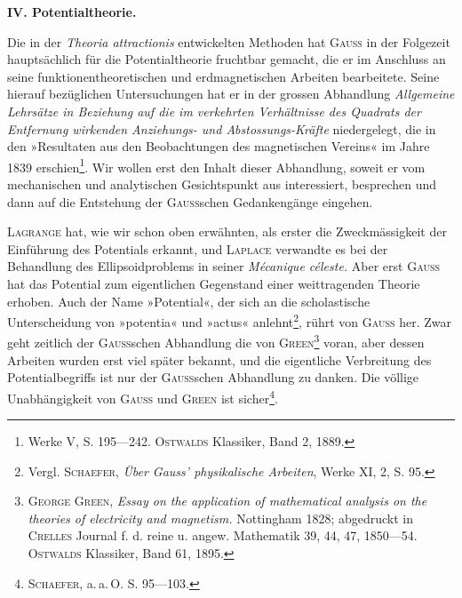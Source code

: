 \clearpage\begingroup{}
\makeatletter\tagsleft@true\let\veqno\@@leqno\makeatother
\renewcommand{\thefootnote}{\arabic{footnote})}\setcounter{footnote}{71}
\begin{center}\textbf{IV. Potentialtheorie.}\par\medskip
{}\end{center}
\noindent\hspace*{\parindent}Die in der \textit{Theoria attractionis} entwickelten Methoden hat \textsc{Gauss} in der
Folgezeit hauptsächlich für die Potentialtheorie fruchtbar gemacht, die er im
Anschluss an seine funktionentheoretischen und erdmagnetischen Arbeiten bearbeitete.
Seine hierauf bezüglichen Untersuchungen hat er in der grossen Abhandlung
\textit{Allgemeine Lehrsätze in Beziehung auf die im verkehrten Verhältnisse des Quadrats
der Entfernung wirkenden Anziehungs- und Abstossungs-Kräfte} niedergelegt,
die in den »Resultaten aus den Beobachtungen des magnetischen Vereins« im
Jahre 1839 erschien\footnote{Werke V, S. 195—242. \textsc{Ostwalds} Klassiker, Band 2, 1889.}. Wir wollen erst den Inhalt dieser Abhandlung, soweit
er vom mechanischen und analytischen Gesichtspunkt aus interessiert,
besprechen und dann auf die Entstehung der \textsc{Gauss}schen Gedankengänge eingehen.

\textsc{Lagrange} hat, wie wir schon oben erwähnten, als erster die Zweckmässigkeit
der Einführung des Potentials erkannt, und \textsc{Laplace} verwandte es bei
der Behandlung des Ellipsoidproblems in seiner \textit{Mécanique céleste.} Aber erst
\textsc{Gauss} hat das Potential zum eigentlichen Gegenstand einer weittragenden
Theorie erhoben. Auch der Name »Potential«, der sich an die scholastische
Unterscheidung von »potentia« und »actus« anlehnt\footnote{Vergl. \textsc{Schaefer}, \textit{Über Gauss’ physikalische Arbeiten}, Werke XI, 2, S. 95.}, rührt von \textsc{Gauss} her.
Zwar geht zeitlich der \textsc{Gauss}schen Abhandlung die von \textsc{Green}\footnote{\textsc{George Green}, \textit{Essay on the application of mathematical analysis on the theories of electricity
and magnetism.} Nottingham 1828; abgedruckt in \textsc{Crelles} Journal f. d. reine u. angew. Mathematik 39,
44, 47, 1850—54. \textsc{Ostwalds} Klassiker, Band 61, 1895.} voran, aber
dessen Arbeiten wurden erst viel später bekannt, und die eigentliche Verbreitung
des Potentialbegriffs ist nur der \textsc{Gauss}schen Abhandlung zu danken.
Die völlige Unabhängigkeit von \textsc{Gauss} und \textsc{Green} ist sicher\footnote{\textsc{Schaefer}, a.\,a.\,O. S. 95—103.}.


